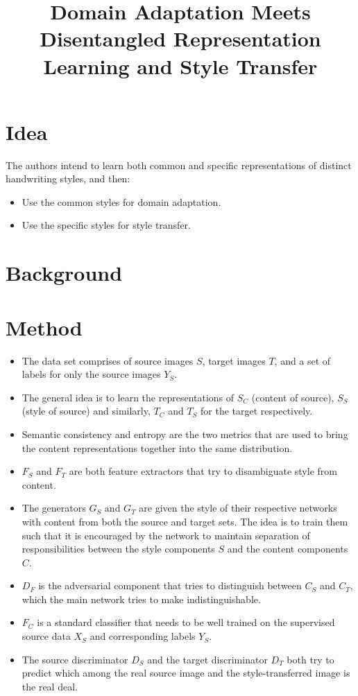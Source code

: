 \documentclass[12pt]{article}
\begin{document}
\title{Domain Adaptation Meets Disentangled Representation Learning and Style Transfer}
\author{}
\date{}
\maketitle

\section{Idea}
  The authors intend to learn both common and specific representations of distinct handwriting styles, and then:
  \begin{itemize}
    \item Use the common styles for domain adaptation.
    \item Use the specific styles for style transfer.
  \end{itemize}
\section{Background}

\section{Method}
  \begin{itemize}
    \item The data set comprises of source images $S$, target images $T$, and a set of labels for only the source images $Y_S$.
    \item The general idea is to learn the representations of $S_C$ (content of source), $S_S$ (style of source) and similarly, $T_C$ and $T_S$ for the target respectively.
    \item Semantic consistency and entropy are the two metrics that are used to bring the content representations together into the same distribution.
    \item $F_S$ and $F_T$ are both feature extractors that try to disambiguate style from content.
    \item The generators $G_S$ and $G_T$ are given the style of their respective networks with content from both the source and target sets. The idea is to train them such that it is encouraged by the network to maintain separation of responsibilities between the style components $S$ and the content components $C$.
    \item $D_F$ is the adversarial component that tries to distinguish between $C_S$ and $C_T$, which the main network tries to make indistinguishable.
    \item $F_C$ is a standard classifier that needs to be well trained on the supervised source data $X_S$ and corresponding labels $Y_S$.
    \item The source discriminator $D_S$ and the target discriminator $D_T$ both try to predict which among the real source image and the style-transferred image is the real deal.
  \end{itemize}
\end{document}
